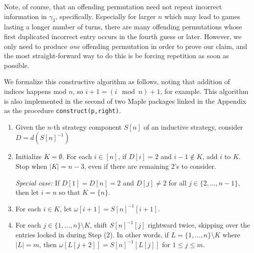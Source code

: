 \documentclass[article]{amsart}
\theoremstyle{plain}
\begin{document}
Note, of course, that an offending permutation need not repeat incorrect information in $\gamma_3$, specifically. Especially for larger $n$ which may lead to games lasting a longer number of turns, there are many offending permutations whose first duplicated incorrect entry occurs in the fourth guess or later. However, we only need to produce \textit{one} offending permutation in order to prove our claim, and the most straight-forward way to do this is be forcing repetition as soon as possible.

We formalize this constructive algorithm as follows, noting that addition of indices happens mod $n$, so $i+ 1 = (i \mod n) + 1$, for example. This algorithm is also implemented in the second of two Maple packages linked in the Appendix as the procedure \texttt{construct(p,right)}.

\begin{algorithm} 
\caption{Offending Permutation Constructor For $2 \in D$} \label{alg:2s}
\begin{enumerate}
    \item [(0)] Given the $n$-th strategy component $S[n]$ of an inductive strategy, consider $D = d\left( S[n]^{-1} \right)$

    \item Initialize $K = \emptyset$. For each $i \in [n]$, if $D[i] = 2$ and $i-1 \notin K$, add $i$ to $K$. Stop when $|K| = n-3$, even if there are remaining 2's to consider.
    
    \textit{Special case:} If $D[1] = D[n] = 2$ and $D[j] \neq 2$ for all $j \in \{2,\dots,n-1\}$, then let $i = n$ so that $K = \{n\}$. 
    
    \item For each $i \in K$, let $\omega[i+1] = S[n]^{-1}[i+1]$.

    \item For each $j \in \{1,\dots, n\} \setminus K$, shift $S[n]^{-1}[j]$ rightward twice, skipping over the entries locked in during Step (2). In other words, if $L = \{1, \dots, n\} \setminus K$ where $|L| = m$, then $\omega [L[j+2]] = S[n]^{-1}[L[j]]$ for $1 \leq j \leq m$.
    
\end{enumerate}
\end{algorithm}
\end{document}
